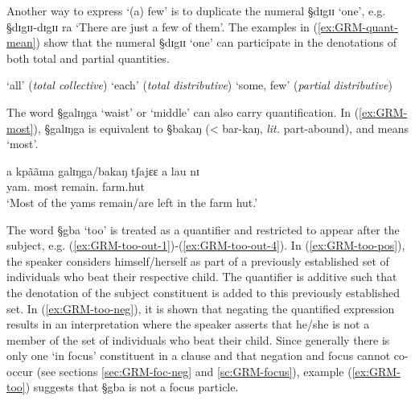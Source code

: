 Another way to express `(a) few'  is to duplicate the numeral {\S dɪgɪɪ} `one',
e.g.
{\S dɪgɪɪ-dɪgɪɪ ra} `There are just a few of them'.  The  examples in 
(\ref{ex:GRM-quant-mean}) show that the numeral {\S dɪgɪɪ} `one' can
participate in the denotations of both total and partial quantities. 

\begin{exe}

 \ex\label{ex:GRM-quant-mean}
 \begin{xlist}

  `all' ({\it total collective})
  `each' ({\it total distributive})
  `some, few' ({\it partial distributive})
  \end{xlist}
\end{exe}

The word {\S galɪŋga} `waist' or `middle'  can also carry quantification. In
(\ref{ex:GRM-most}),  {\S galɪŋga} is equivalent to {\S bakaŋ} (< {\I bar-kaŋ},
{\it lit.} part-abound),  and means `most'.

\begin{exe}
 \ex\label{ex:GRM-most}
\gll   a kpããma  galɪŋga/bakaŋ  tʃajɛɛ a lau nɪ\\
{\art} yam.{\pl} most remain.{\pfv} {\art} farm.hut {\postp}\\
\glt  `Most of the yams remain/are left in the farm hut.'
\end{exe}

The word {\S gba} `too' is treated as a quantifier and restricted to appear
after the subject, e.g. (\ref{ex:GRM-too-out-1})-(\ref{ex:GRM-too-out-4}). In
(\ref{ex:GRM-too-pos}), the speaker  considers himself/herself  as part of a
previously established set of individuals who beat their respective child. The
quantifier is additive such that  the denotation of the subject constituent is
added to this previously established set.  In (\ref{ex:GRM-too-neg}), it is
shown that negating the quantified expression results in an interpretation where
the speaker asserts that he/she is not a member of the set of individuals who
beat their child. Since generally there is only one `in focus' constituent in a
clause and that negation and focus cannot co-occur (see sections
\ref{sec:GRM-foc-neg} and  \ref{sc:GRM-focus}), example (\ref{ex:GRM-too})
suggests that {\S gba} is not a focus particle.


